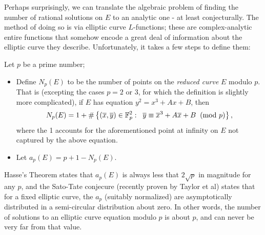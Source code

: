 \documentclass[10pt]{article}
\newcommand{\xbar}{\overline{x}}
\newcommand{\ybar}{\overline{y}}
\begin{document}
Perhaps surprisingly, we can translate the algebraic problem of finding the number of rational solutions on $E$ to an analytic one - at least conjecturally. The method of doing so is via elliptic curve $L$-functions; these are complex-analytic entire functions that somehow encode a great deal of information about the elliptic curve they describe. Unfortunately, it takes a few steps to define them:

\begin{definition}
Let $p$ be a prime number;
\begin{itemize}
\item Define $N_p(E)$ to be the number of points on the {\it reduced curve} $E$ modulo $p$. That is (excepting the cases $p=2$ or $3$, for which the definition is slightly more complicated), if $E$ has equation $y^2 = x^3 + Ax+B$, then
\begin{equation}
N_p(E) = 1 + \#\set{(\xbar,\ybar) \in \Fp^2 : \;\; \ybar \equiv \xbar^3 + A\xbar + B \;\;(\text{mod }p)},
\end{equation}
where the 1 accounts for the aforementioned point at infinity on $E$ not captured by the above equation.
\item Let $a_p(E) = p+1 - N_p(E)$.
\end{itemize}
\end{definition}
Hasse's Theorem states that $a_p(E)$ is always less that $2\sqrt{p}$ in magnitude for any $p$, and the Sato-Tate conjecure (recently proven by Taylor et al) states that for a fixed elliptic curve, the $a_p$ (suitably normalized) are asymptotically distributed in a semi-circular distribution about zero. In other words, the number of solutions to an elliptic curve equation modulo $p$ is about $p$, and can never be very far from that value.
\end{document}
